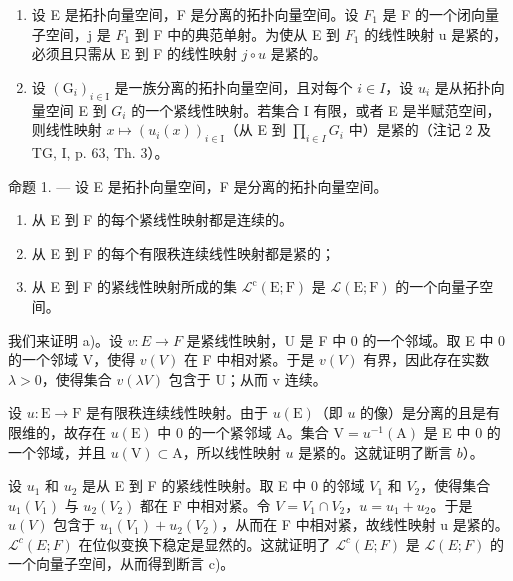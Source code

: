 \begin{enumerate}
\def\labelenumi{\arabic{enumi})}
\setcounter{enumi}{4}
\item
  设 E 是拓扑向量空间，F 是分离的拓扑向量空间。设 \(F_{1}\) 是 F 的一个闭向量子空间，j 是 \(F_{1}\) 到 F 中的典范单射。为使从 E 到 \(F_{1}\) 的线性映射 u 是紧的，必须且只需从 E 到 F 的线性映射 \(j \circ u\) 是紧的。
\item
  设 \((\mathrm{G}_{i})_{i\in\mathrm{I}}\) 是一族分离的拓扑向量空间，且对每个 \(i\in I\)，设 \(u_{i}\) 是从拓扑向量空间 E 到 \(G_{i}\) 的一个紧线性映射。若集合 I 有限，或者 E 是半赋范空间，则线性映射 \(x\mapsto(u_{i}(x))_{i\in\mathrm{I}}\)（从 E 到 \(\prod_{i\in I}G_{i}\) 中）是紧的（注记 2 及 TG, I, p. 63, Th. 3）。
\end{enumerate}

命题 1. --- 设 E 是拓扑向量空间，F 是分离的拓扑向量空间。

\begin{enumerate}
\def\labelenumi{\alph{enumi})}
\item
  从 E 到 F 的每个紧线性映射都是连续的。
\item
  从 E 到 F 的每个有限秩连续线性映射都是紧的；
\item
  从 E 到 F 的紧线性映射所成的集 \(\mathcal{L}^{\mathrm{c}}(\mathrm{E};\mathrm{F})\) 是 \(\mathcal{L}(\mathrm{E};\mathrm{F})\) 的一个向量子空间。
\end{enumerate}

我们来证明 a)。设 \(v: E \rightarrow F\) 是紧线性映射，U 是 F 中 0 的一个邻域。取 E 中 0 的一个邻域 V，使得 \(v(V)\) 在 F 中相对紧。于是 \(v(V)\) 有界，因此存在实数 \(\lambda > 0\)，使得集合 \(v(\lambda V)\) 包含于 U；从而 v 连续。

设 \(u \colon \mathrm{E} \to \mathrm{F}\) 是有限秩连续线性映射。由于 \(u(\mathrm{E})\)（即 \(u\) 的像）是分离的且是有限维的，故存在 \(u(\mathrm{E})\) 中 0 的一个紧邻域 A。集合 \(\mathrm{V} = u^{-1}(\mathrm{A})\) 是 E 中 0 的一个邻域，并且 \(u(\mathrm{V}) \subset \mathrm{A}\)，所以线性映射 \(u\) 是紧的。这就证明了断言 \(b\)）。

设 \(u_{1}\) 和 \(u_{2}\) 是从 E 到 F 的紧线性映射。取 E 中 0 的邻域 \(V_{1}\) 和 \(V_{2}\)，使得集合 \(u_{1}(V_{1})\) 与 \(u_{2}(V_{2})\) 都在 F 中相对紧。令 \(V = V_{1} \cap V_{2}\)，\(u = u_{1} + u_{2}\)。于是 \(u(V)\) 包含于 \(u_{1}(V_{1}) + u_{2}(V_{2})\)，从而在 F 中相对紧，故线性映射 u 是紧的。\(\mathcal{L}^{c}(E;F)\) 在位似变换下稳定是显然的。这就证明了 \(\mathcal{L}^{c}(E;F)\) 是 \(\mathcal{L}(E;F)\) 的一个向量子空间，从而得到断言 c)。

